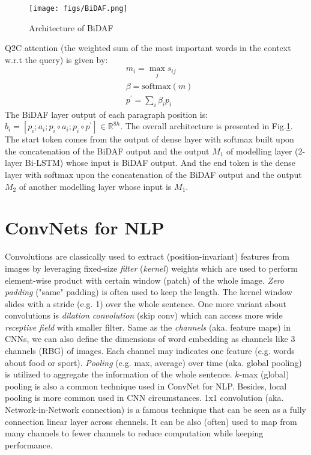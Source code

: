 \begin{figure}[!thp]
	\centerline{\texttt{[image: figs/BiDAF.png]}}
	\caption{Architecture of BiDAF}
	\label{fig:bidaf}
\end{figure}

Q2C attention (the weighted sum of the most important words in the context w.r.t the query) is given by:
\begin{align}
&m_i = \max_j s_{ij} \\
&\beta = \text{softmax}(m) \\
&p^\prime = \sum_i \beta_i p_i
\end{align}
The BiDAF layer output of each paragraph position is: $b_i = [p_i; a_i; p_i \circ a_i; p_i \circ p^\prime] \in \mathbb{R}^{8h}$.
The overall architecture is presented in Fig.\ref{fig:bidaf}.
The start token comes from the output of dense layer with softmax built upon the concatenation of the BiDAF output and the output $M_1$ of modelling layer (2-layer Bi-LSTM) whose input is BiDAF output.
And the end token is the dense layer with softmax upon the concatenation of the BiDAF output and the output $M_2$ of another modelling layer whose input is $M_1$.

\section{ConvNets for NLP}

Convolutions are classically used to extract (position-invariant) features from images by leveraging fixed-size \emph{filter} (\emph{kernel}) weights which are used to perform element-wise product with certain window (patch) of the whole image.
\emph{Zero padding} ("same" padding) is often used to keep the length.
The kernel window slides with a stride (e.g. 1) over the whole sentence.
One more variant about convolutions is \emph{dilation convolution} (skip conv) which can access more wide \emph{receptive field} with smaller filter.
Same as the \emph{channels} (aka. feature maps) in CNNs, we can also define the dimensions of word embedding as channels like 3 channels (RBG) of images.
Each channel may indicates one feature (e.g. words about food or sport).
\emph{Pooling} (e.g. max, average) over time (aka. global pooling) is utilized to aggregate the information of the whole sentence.
$k$-max (global) pooling is also a common technique used in ConvNet for NLP.
Besides, local pooling is more common used in CNN circumstances.
1x1 convolution (aka. Network-in-Network connection) is a famous technique that can be seen as a fully connection linear layer across chennels.
It can be also (often) used to map from many channels to fewer channels to reduce computation while keeping performance.

